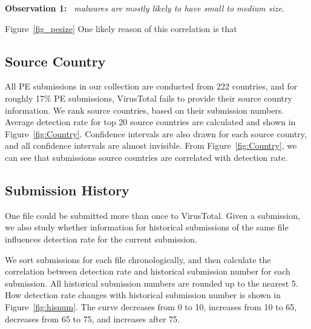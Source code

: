{\bf Observation 1:} 
{\em \pe\ malwares are mostly likely to have small to medium size.}

Figure~\ref{fig_pesize}
One likely reason of this correlation is that  

\subsection{Source Country}
\label{sec:country}

All PE submissions in our collection are conducted from 222 countries, 
and for roughly 17\% PE submissions, 
VirusTotal fails to provide their source country information. 
We rank source countries, based on their submission numbers. 
Average detection rate for top 20 source countries are calculated and shown in 
Figure~\ref{fig:Country}. 
Confidence intervals are also drawn for each source country, 
and all confidence intervals are almost invisible. 
From Figure~\ref{fig:Country}, 
we can see that submissions source countries are correlated with detection rate.

\fi


\subsection{Submission History}
\label{sec:history}



One file could be submitted more than once to VirusTotal. 
Given a submission, we also study whether information for historical 
submissions of the same file influences detection rate for the current submission. 

We sort submissions for each file chronologically, 
and then calculate the correlation between detection rate and historical submission number for each submission. 
All historical submission numbers are rounded up to the nearest 5. 
How detection rate changes with historical submission number is shown in Figure~\ref{fig:hisnum}. 
The curve decreases from 0 to 10, increases from 10 to 65, decreases from 65 to 75, and increases after 75. 

